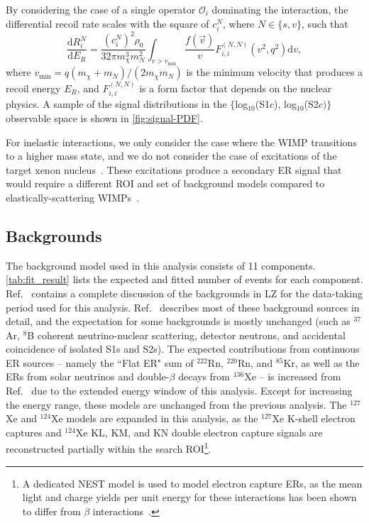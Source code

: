 \documentclass[reprint, showpacs,
preprintnumbers,
amsmath,amssymb,
aps, floatfix,
superscriptaddress,
prd, nofootinbib]{revtex4-1}
\begin{document}
By considering the case of a single operator $\mathcal{O}_i$ dominating the interaction, the differential recoil rate scales with the square of $c_i^N$, where $N \in \{s, v\}$, such that
\begin{equation}\label{eq:spectrumReduced}
     \frac{\mathrm{d} R_i^N}{\mathrm{d} E_{R}}=\frac{(c_{i}^{N})^2 \rho_{0}}{32 \pi m_{\chi}^{3} m_{N}^{2}} \int_{v>v_\text{min}} \frac{f(\vec{v})}{v} F_{i, i}^{\left(N, N\right)}\left(v^2, q^{2}\right) \mathrm{d}{v},
\end{equation}
where $v_\text{min} = q(m_\chi + m_N) / (2 m_\chi m_N)$ is the minimum velocity that produces a recoil energy $E_R$, and $F_{i,i}^{(N, N)}$ is a form factor that depends on the nuclear physics. 
A sample of the signal distributions in the $\{$log$_{10}$(S1$c$), log$_{10}$(S2$c)\}$ observable space is shown in \autoref{fig:signal-PDF}. 

For inelastic interactions, we only consider the case where the WIMP transitions to a higher mass state, and we do not consider the case of excitations of the target xenon nucleus~\cite{McCabe:2015eia,Baudis:ineasltic_xenon_searching}. These excitations produce a secondary ER signal that would require a different ROI and set of background models compared to elastically-scattering WIMPs~\cite{XENON_inelastic}. 

\subsection{\label{subsec:bg}Backgrounds}
\par
The background model used in this analysis consists of 11 components.
\autoref{tab:fit_result} lists the expected and fitted number of events for each component.
Ref.~\cite{LZ:sr1backgrounds_2022} contains a complete discussion of the backgrounds in LZ for the data-taking period used for this analysis.
Ref.~\cite{LZ:SR1WS_2022} describes most of these background sources in detail, and the expectation for some backgrounds is mostly unchanged (such as ${}^{37}$Ar, ${}^{8}$B coherent neutrino-nuclear scattering, detector neutrons, and accidental coincidence of isolated S1s and S2s). 
The expected contributions from continuous ER sources -- namely the ``Flat ER" sum of ${}^{222}$Rn, ${}^{220}$Rn, and ${}^{85}$Kr, as well as the ERs from solar neutrinos and double-$\beta$ decays from ${}^{136}$Xe -- is increased from Ref.~\cite{LZ:SR1WS_2022} due to the extended energy window of this analysis. 
Except for increasing the energy range, these models are unchanged from the previous analysis. 
The ${}^{127}$Xe and ${}^{124}$Xe models are expanded in this analysis, as the ${}^{127}$Xe K-shell electron captures and ${}^{124}$Xe KL, KM, and KN double electron capture signals are reconstructed partially within the search ROI\footnote{A dedicated NEST model is used to model electron capture ERs, as the mean light and charge yields per unit energy for these interactions has been shown to differ from $\beta$ interactions~\cite{XELDA_Lshell_EC}.}.
\end{document}
